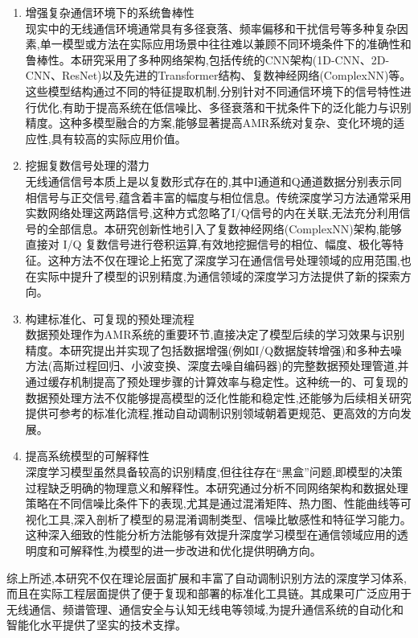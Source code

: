 \documentclass{article}
\begin{document}
\begin{CJK}{UTF8}{gbsn}
\begin{enumerate}
    \item 增强复杂通信环境下的系统鲁棒性 \\
    现实中的无线通信环境通常具有多径衰落、频率偏移和干扰信号等多种复杂因素,单一模型或方法在实际应用场景中往往难以兼顾不同环境条件下的准确性和鲁棒性。本研究采用了多种网络架构,包括传统的CNN架构(1D-CNN、2D-CNN、ResNet)以及先进的Transformer结构、复数神经网络(ComplexNN)等。这些模型结构通过不同的特征提取机制,分别针对不同通信环境下的信号特性进行优化,有助于提高系统在低信噪比、多径衰落和干扰条件下的泛化能力与识别精度。这种多模型融合的方案,能够显著提高AMR系统对复杂、变化环境的适应性,具有较高的实际应用价值。
    \item 挖掘复数信号处理的潜力 \\
    无线通信信号本质上是以复数形式存在的,其中I通道和Q通道数据分别表示同相信号与正交信号,蕴含着丰富的幅度与相位信息。传统深度学习方法通常采用实数网络处理这两路信号,这种方式忽略了I/Q信号的内在关联,无法充分利用信号的全部信息。本研究创新性地引入了复数神经网络(ComplexNN)架构,能够直接对 I/Q 复数信号进行卷积运算,有效地挖掘信号的相位、幅度、极化等特征。这种方法不仅在理论上拓宽了深度学习在通信信号处理领域的应用范围,也在实际中提升了模型的识别精度,为通信领域的深度学习方法提供了新的探索方向。
    \item 构建标准化、可复现的预处理流程 \\
    数据预处理作为AMR系统的重要环节,直接决定了模型后续的学习效果与识别精度。本研究提出并实现了包括数据增强(例如I/Q数据旋转增强)和多种去噪方法(高斯过程回归、小波变换、深度去噪自编码器)的完整数据预处理管道,并通过缓存机制提高了预处理步骤的计算效率与稳定性。这种统一的、可复现的数据预处理方法不仅能够提高模型的泛化性能和稳定性,还能够为后续相关研究提供可参考的标准化流程,推动自动调制识别领域朝着更规范、更高效的方向发展。
    \item 提高系统模型的可解释性 \\
    深度学习模型虽然具备较高的识别精度,但往往存在“黑盒”问题,即模型的决策过程缺乏明确的物理意义和解释性。本研究通过分析不同网络架构和数据处理策略在不同信噪比条件下的表现,尤其是通过混淆矩阵、热力图、性能曲线等可视化工具,深入剖析了模型的易混淆调制类型、信噪比敏感性和特征学习能力。这种深入细致的性能分析方法能够有效提升深度学习模型在通信领域应用的透明度和可解释性,为模型的进一步改进和优化提供明确方向。
\end{enumerate}
综上所述,本研究不仅在理论层面扩展和丰富了自动调制识别方法的深度学习体系,而且在实际工程层面提供了便于复现和部署的标准化工具链。其成果可广泛应用于无线通信、频谱管理、通信安全与认知无线电等领域,为提升通信系统的自动化和智能化水平提供了坚实的技术支撑。


\end{CJK}
\end{document}
